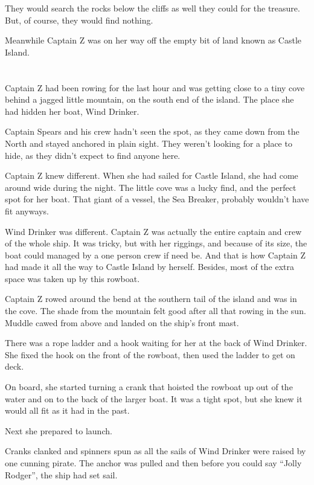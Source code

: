 \documentclass[12pt]{extbook}
\begin{document}
  They would search the rocks below the cliffs as well they could for the
  treasure. But, of course, they would find nothing.
  
  Meanwhile Captain Z was on her way off the empty bit of land known as
  Castle Island.
  
  \section{}\label{section-24}
  
  Captain Z had been rowing for the last hour and was getting close to a
  tiny cove behind a jagged little mountain, on the south end of the
  island. The place she had hidden her boat, Wind Drinker.
  
  Captain Spears and his crew hadn't seen the spot, as they came down from
  the North and stayed anchored in plain sight. They weren't looking for a
  place to hide, as they didn't expect to find anyone here.
  
  Captain Z knew different. When she had sailed for Castle Island, she had
  come around wide during the night. The little cove was a lucky find, and
  the perfect spot for her boat. That giant of a vessel, the Sea Breaker,
  probably wouldn't have fit anyways.
  
  Wind Drinker was different. Captain Z was actually the entire captain
  and crew of the whole ship. It was tricky, but with her riggings, and
  because of its size, the boat could managed by a one person crew if need
  be. And that is how Captain Z had made it all the way to Castle Island
  by herself. Besides, most of the extra space was taken up by this
  rowboat.
  
  Captain Z rowed around the bend at the southern tail of the island and
  was in the cove. The shade from the mountain felt good after all that
  rowing in the sun. Muddle cawed from above and landed on the ship's
  front mast.
  
  There was a rope ladder and a hook waiting for her at the back of Wind
  Drinker. She fixed the hook on the front of the rowboat, then used the
  ladder to get on deck.
  
  On board, she started turning a crank that hoisted the rowboat up out of
  the water and on to the back of the larger boat. It was a tight spot,
  but she knew it would all fit as it had in the past.
  
  Next she prepared to launch.
  
  Cranks clanked and spinners spun as all the sails of Wind Drinker were
  raised by one cunning pirate. The anchor was pulled and then before you
  could say \enquote{Jolly Rodger}, the ship had set sail.
  
\end{document}
